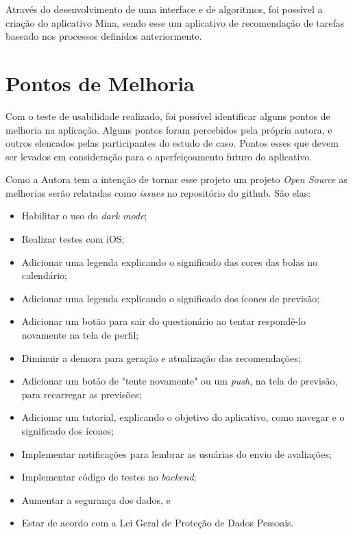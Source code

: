 Através do desenvolvimento de uma interface e de algoritmos, foi possível a criação do aplicativo Mina, 
sendo esse um aplicativo de recomendação de tarefas baseado nos processos definidos anteriormente.

\section{Pontos de Melhoria}

Com o teste de usabilidade realizado, foi possível identificar alguns pontos de melhoria na aplicação. 
Alguns pontos foram percebidos pela própria autora, e outros elencados pelas participantes do estudo de caso. Pontos esses 
que devem ser levados em consideração para o aperfeiçoamento futuro do aplicativo.

Como a Autora tem a intenção de tornar esse projeto um projeto \emph{Open Source} as melhorias serão 
relatadas como \emph{issues} no repositório do github. São elas:

\begin{itemize}

    \item Habilitar o uso do \emph{dark mode};
    \item Realizar testes com iOS;
    \item Adicionar uma legenda explicando o significado das cores das bolas no calendário;
    \item Adicionar uma legenda explicando o significado dos ícones de previsão;
    \item Adicionar um botão para sair do questionário ao tentar respondê-lo novamente na tela de perfil;
    \item Diminuir a demora para geração e atualização das recomendações;
    \item Adicionar um botão de "tente novamente" ou um \emph{push}, na tela de previsão, para recarregar as previsões;
    \item Adicionar um tutorial, explicando o objetivo do aplicativo, como navegar e o significado dos ícones;
    \item Implementar notificações para lembrar as usuárias do envio de avaliações;
    \item Implementar código de testes no \emph{backend};
    \item Aumentar a segurança dos dados, e
    \item Estar de acordo com a Lei Geral de Proteção de Dados Pessoais.

\end{itemize}

